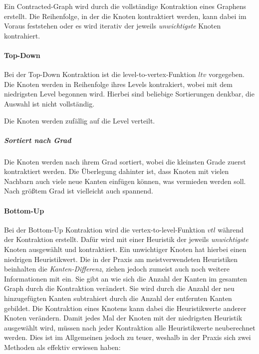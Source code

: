Ein Contracted-Graph wird durch die vollständige Kontraktion eines Graphens erstellt.
Die Reihenfolge, in der die Knoten kontraktiert werden, kann dabei im Voraus feststehen oder es wird iterativ der jeweils \emph{unwichtigste} Knoten kontrahiert.

\paragraph{Top-Down}

Bei der Top-Down Kontraktion ist die level-to-vertex-Funktion ${ltv}$ vorgegeben.
Die Knoten werden in Reihenfolge ihres Levels kontrakiert, wobei mit dem niedrigsten Level begonnen wird.
Hierbei sind beliebige Sortierungen denkbar, die Auswahl ist nicht vollständig.


Die Knoten werden zufällig auf die Level verteilt.


\subparagraph{Sortiert nach Grad}
Die Knoten werden nach ihrem Grad sortiert, wobei die kleinsten Grade zuerst kontraktiert werden.
Die Überlegung dahinter ist, dass Knoten mit vielen Nachbarn auch viele neue Kanten einfügen können, was vermieden werden soll.
Nach größtem Grad ist vielleicht auch spannend.


\paragraph{Bottom-Up}

Bei der Bottom-Up Kontraktion wird die vertex-to-level-Funktion ${vtl}$ während der Kontraktion erstellt.
Dafür wird mit einer Heuristik der jeweils \emph{unwichtigste} Knoten ausgewählt und kontraktiert.
Ein unwichtiger Knoten hat hierbei einen niedrigen Heuristikwert.
Die in der Praxis am meistverwendeten Heuristiken beinhalten die \emph{Kanten-Differenz}, ziehen jedoch zumeist auch noch weitere Informationen mit ein.
Sie gibt an wie sich die Anzahl der Kanten im gesamten Graph durch die Kontraktion verändert.
Sie wird durch die Anzahl der neu hinzugefügten Kanten subtrahiert durch die Anzahl der entfernten Kanten gebildet.
Die Kontraktion eines Knotens kann dabei die Heuristikwerte anderer Knoten verändern.
Damit jedes Mal der Knoten mit der niedrigsten Heuristik ausgewählt wird, müssen nach jeder Kontraktion alle Heuristikwerte neuberechnet werden.
Dies ist im Allgemeinen jedoch zu teuer, weshalb in der Praxis sich zwei Methoden als effektiv erwiesen haben:

